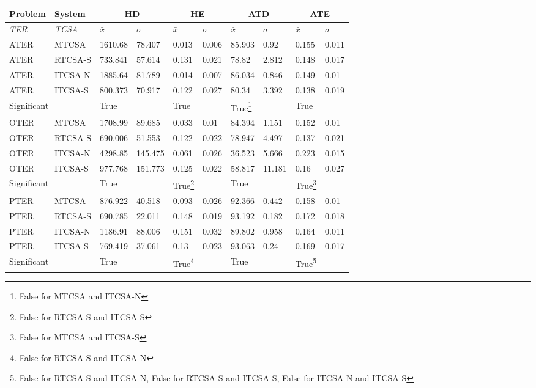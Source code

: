 \begin{table}[H]
	\centering\small
		\begin{minipage}{\textwidth}	
		\begin{tabular}{llllllllll}
		\toprule
		\textbf{Problem} & \textbf{System} & \multicolumn{2}{c}{\textbf{HD}} & \multicolumn{2}{c}{\textbf{HE}} & \multicolumn{2}{c}{\textbf{ATD}} & \multicolumn{2}{c}{\textbf{ATE}} \\ 
		\midrule
		\emph{TER} & \emph{TCSA} & $\bar{x}$ & $\sigma$ & $\bar{x}$ & $\sigma$ & $\bar{x}$ & $\sigma$ & $\bar{x}$ & $\sigma$ \\ 
		\toprule		
		ATER & MTCSA & 1610.68 & 78.407 & 0.013 & 0.006 & 85.903 & 0.92 & 0.155 & 0.011 \\ 
		ATER & RTCSA-S & 733.841 & 57.614 & 0.131 & 0.021 & 78.82 & 2.812 & 0.148 & 0.017 \\ 
		ATER & ITCSA-N & 1885.64 & 81.789 & 0.014 & 0.007 & 86.034 & 0.846 & 0.149 & 0.01 \\ 
		ATER & ITCSA-S & 800.373 & 70.917 & 0.122 & 0.027 & 80.34 & 3.392 & 0.138 & 0.019 \\ 
		\multicolumn{2}{l}{Significant} & True &  & True & & True\footnote{False for MTCSA and ITCSA-N} &  & True &  \\ 
		\midrule
		OTER & MTCSA & 1708.99 & 89.685 & 0.033 & 0.01 & 84.394 & 1.151 & 0.152 & 0.01 \\ 
		OTER & RTCSA-S & 690.006 & 51.553 & 0.122 & 0.022 & 78.947 & 4.497 & 0.137 & 0.021 \\ 
		OTER & ITCSA-N & 4298.85 & 145.475 & 0.061 & 0.026 & 36.523 & 5.666 & 0.223 & 0.015 \\ 
		OTER & ITCSA-S & 977.768 & 151.773 & 0.125 & 0.022 & 58.817 & 11.181 & 0.16 & 0.027 \\ 
		\multicolumn{2}{l}{Significant} & True &  & True\footnote{False for RTCSA-S and ITCSA-S} &  & True &  & True\footnote{False for MTCSA and ITCSA-S} &  \\ 
		\midrule
		PTER & MTCSA & 876.922 & 40.518 & 0.093 & 0.026 & 92.366 & 0.442 & 0.158 & 0.01 \\ 
		PTER & RTCSA-S & 690.785 & 22.011 & 0.148 & 0.019 & 93.192 & 0.182 & 0.172 & 0.018 \\ 
		PTER & ITCSA-N & 1186.91 & 88.006 & 0.151 & 0.032 & 89.802 & 0.958 & 0.164 & 0.011 \\ 
		PTER & ITCSA-S & 769.419 & 37.061 & 0.13 & 0.023 & 93.063 & 0.24 & 0.169 & 0.017 \\ 
		\multicolumn{2}{l}{Significant} & True &  & True\footnote{False for RTCSA-S and ITCSA-N} &  & True &  & True\footnote{False for RTCSA-S and ITCSA-N, False for RTCSA-S and ITCSA-S, False for ITCSA-N and ITCSA-S} &  \\ 

\end{tabular}
\end{minipage}
\end{table}
